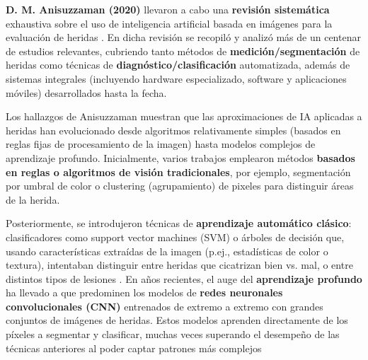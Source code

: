 \textbf{D. M. Anisuzzaman  (2020)} llevaron a cabo una \textbf{revisión sistemática} exhaustiva sobre el uso de inteligencia artificial basada en imágenes para la evaluación de heridas \cite{https://doi.org/10.48550/arxiv.2009.07141}. En dicha revisión se recopiló y analizó más de un centenar de estudios relevantes, cubriendo tanto métodos de \textbf{medición/segmentación} de heridas como técnicas de \textbf{diagnóstico/clasificación} automatizada, además de sistemas integrales (incluyendo hardware especializado, software y aplicaciones móviles) desarrollados hasta la fecha.

Los hallazgos de Anisuzzaman  muestran que las aproximaciones de IA aplicadas a heridas han evolucionado desde algoritmos relativamente simples (basados en reglas fijas de procesamiento de la imagen) hasta modelos complejos de aprendizaje profundo. Inicialmente, varios trabajos emplearon métodos \textbf{basados en reglas o algoritmos de visión tradicionales}, por ejemplo, segmentación por umbral de color o clustering (agrupamiento) de pixeles para distinguir áreas de la herida.

Posteriormente, se introdujeron técnicas de \textbf{aprendizaje automático clásico}: clasificadores como support vector machines (SVM) o árboles de decisión que, usando características extraídas de la imagen (p.ej., estadísticas de color o textura), intentaban distinguir entre heridas que cicatrizan bien vs. mal, o entre distintos tipos de lesiones \cite{Curti2024}. En años recientes, el auge del \textbf{aprendizaje profundo} ha llevado a que predominen los modelos de \textbf{redes neuronales convolucionales (CNN)} entrenados de extremo a extremo con grandes conjuntos de imágenes de heridas. Estos modelos aprenden directamente de los píxeles a segmentar y clasificar, muchas veces superando el desempeño de las técnicas anteriores al poder captar patrones más complejos

